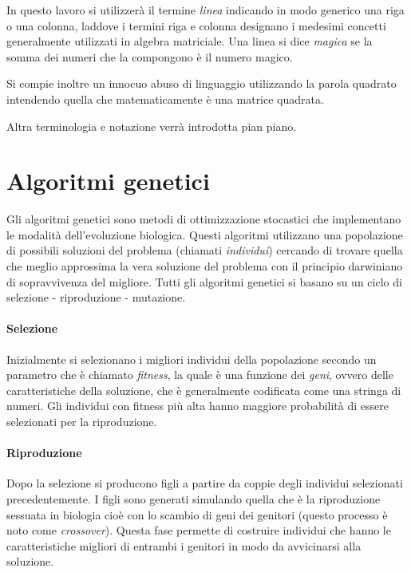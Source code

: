 \documentclass[italian,twoside,twocolumn]{article}
\begin{document}
In questo lavoro si utilizzerà il termine \emph{linea} indicando in modo generico una riga o una colonna, laddove i termini riga e colonna designano i medesimi concetti generalmente utilizzati in algebra matriciale. Una linea si dice \emph{magica} se la somma dei numeri che la compongono è il numero magico. 

Si compie inoltre un innocuo abuso di linguaggio utilizzando la parola quadrato intendendo quella che matematicamente è una matrice quadrata.

Altra terminologia e notazione verrà introdotta pian piano.

\section{Algoritmi genetici}
Gli algoritmi genetici sono metodi di ottimizzazione stocastici che implementano le modalità dell'evoluzione biologica. Questi algoritmi utilizzano una popolazione di possibili soluzioni del problema (chiamati \emph{individui}) cercando di trovare quella che meglio approssima la vera soluzione del problema con il principio darwiniano di sopravvivenza del migliore. Tutti gli algoritmi genetici si basano su un ciclo di selezione - riproduzione - mutazione.
\paragraph{Selezione} Inizialmente si selezionano i migliori individui della popolazione secondo un parametro che è chiamato \emph{fitness}, la quale è una funzione dei \emph{geni}, ovvero delle caratteristiche della soluzione, che è generalmente codificata come una stringa di numeri. Gli individui con fitness più alta hanno maggiore probabilità di essere selezionati per la riproduzione.

\paragraph{Riproduzione} Dopo la selezione si producono figli a partire da coppie degli individui selezionati precedentemente. I figli sono generati simulando quella che è la riproduzione sessuata in biologia cioè con lo scambio di geni dei genitori (questo processo è noto come \emph{crossover}). Questa fase permette di costruire individui che hanno le caratteristiche migliori di entrambi i genitori in modo da avvicinarsi alla soluzione.
\end{document}
